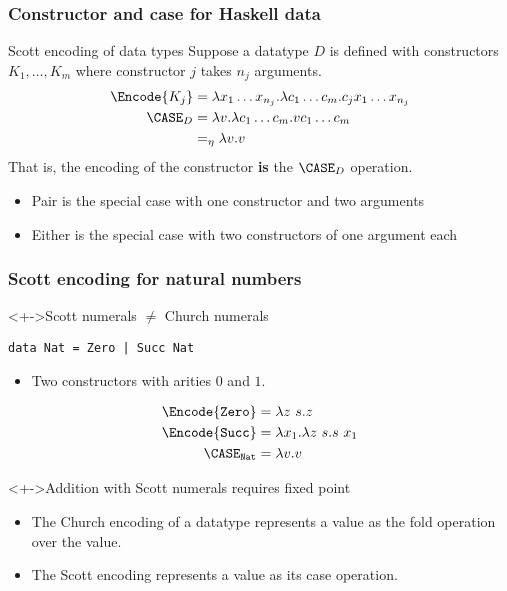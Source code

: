 \documentclass[pdftex,aspectratio=169]{beamer}
\begin{document}
\begin{frame}
  \frametitle{Constructor and case for Haskell data}
  \begin{block}{Scott encoding of data types}
    Suppose a datatype $D$ is defined with constructors
    $K_1, \dots, K_m$ where constructor $j$ takes $n_j$ arguments.
    \begin{align*}
      \Encode{K_j} &= \lambda x_1 \dots x_{n_j}. \lambda c_1 \dots
                     c_m. c_j x_1 \dots x_{n_j}
      \\
      \CASE_D &= \lambda v. \lambda c_1 \dots c_m. v c_1 \dots c_m
      \\
                   &=_\eta \lambda v.v
    \end{align*}
    That is, the encoding of the constructor \textbf{is} the $\CASE_D$
    operation.
    \begin{itemize}
    \item Pair is the special case with one constructor and two
      arguments
    \item Either is the special case with two constructors of one
      argument each
    \end{itemize}
  \end{block}
\end{frame}

\begin{frame}[fragile]
  \frametitle{Scott encoding for natural numbers}
  \begin{block}<+->{Scott numerals $\ne$ Church numerals}
\begin{lstlisting}
data Nat = Zero | Succ Nat
\end{lstlisting}
    \begin{itemize}
    \item Two constructors with arities $0$ and $1$.
    \end{itemize}
    \begin{align*}
      \Encode{\mathtt{Zero}} & = \lambda z\ s. z \\
      \Encode{\mathtt{Succ}} &= \lambda x_1. \lambda z\ s. s\ x_1 \\
      \CASE_{\mathtt{Nat}} &= \lambda v.v
    \end{align*}
  \end{block}
  \begin{block}<+->{Addition with Scott numerals requires fixed point}
    \begin{itemize}
    \item The Church encoding of a datatype represents a value as the
      fold operation over the value.
    \item The Scott encoding represents a value as its case operation.
    \end{itemize}
  \end{block}
\end{frame}
\end{document}
